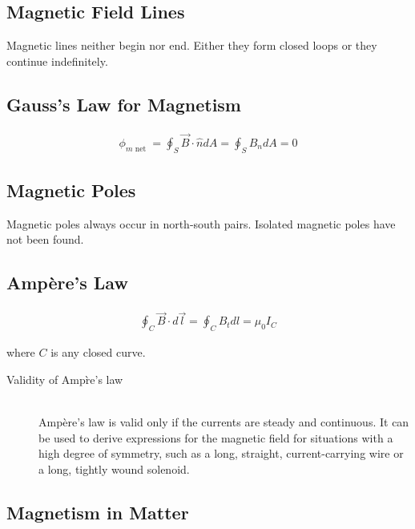 \documentclass[../main.tex]{subfiles}
\begin{document}
\subsection{Magnetic Field Lines}
\label{sub:magnetic_field_lines}

Magnetic lines neither begin nor end. Either they form closed loops or they
continue indefinitely.

\subsection{Gauss's Law for Magnetism}
\label{sub:gauss_s_law_for_magnetism}

\begin{align}
  \phi_{m \text{ net }} = \oint_S\vec{B}\cdot\hat{n}dA = \oint_SB_ndA = 0
\end{align}

\subsection{Magnetic Poles}
\label{sub:magnetic_poles}

Magnetic poles always occur in north-south pairs. Isolated magnetic poles have
not been found.

\subsection{Amp\`ere's Law}
\label{sub:ampe`re_s_law}

\begin{align}
  \oint_C\vec{B}\cdot d\vec{l} = \oint_CB_tdl = \mu_0I_C
\end{align}

where $C$ is any closed curve.

\begin{description}
  \item[Validity of Amp\`re's law] \hfill \\
    Amp\`ere's law is valid only if the currents are steady and continuous. It
    can be used to derive expressions for the magnetic field for situations
    with a high degree of symmetry, such as a long, straight, current-carrying
    wire or a long, tightly wound solenoid.
\end{description}

\subsection{Magnetism in Matter}
\label{sub:magnetism_in_matter}
\end{document}
